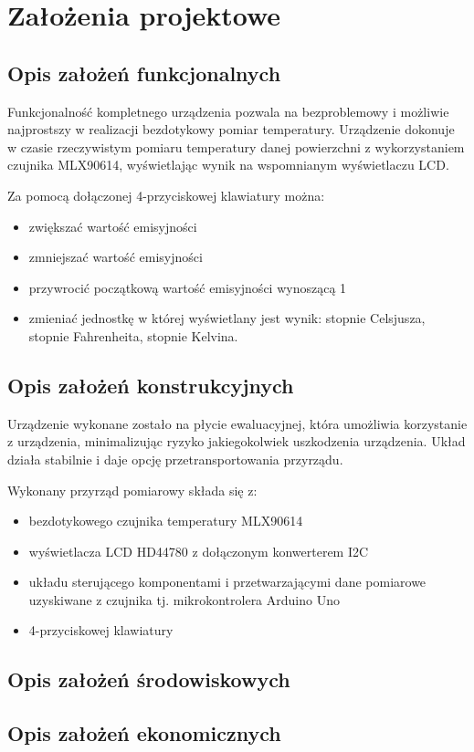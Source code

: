 \chapter{Założenia projektowe}

    \section{Opis założeń funkcjonalnych}

    Funkcjonalność kompletnego urządzenia pozwala na bezproblemowy i możliwie najprostszy w realizacji bezdotykowy pomiar temperatury. Urządzenie dokonuje w czasie rzeczywistym pomiaru temperatury danej powierzchni z wykorzystaniem czujnika MLX90614, wyświetlając wynik na wspomnianym wyświetlaczu LCD. 
    
    \vspace{12pt}

    Za pomocą dołączonej 4-przyciskowej klawiatury można:

    \begin{itemize}

        \item zwiększać wartość emisyjności
        \item zmniejszać wartość emisyjności
        \item przywrocić początkową wartość emisyjności wynoszącą 1
        \item zmieniać jednostkę w której wyświetlany jest wynik: stopnie Celsjusza, stopnie Fahrenheita, stopnie Kelvina.

    \end{itemize}

    \section{Opis założeń konstrukcyjnych}
    
    Urządzenie wykonane zostało na płycie ewaluacyjnej, która umożliwia korzystanie z urządzenia, minimalizując ryzyko jakiegokolwiek uszkodzenia urządzenia. Układ działa stabilnie i daje opcję przetransportowania przyrządu.

    \vspace{12pt}

    Wykonany przyrząd pomiarowy składa się z:

    \begin{itemize}

        \item bezdotykowego czujnika temperatury MLX90614
        \item wyświetlacza LCD HD44780 z dołączonym konwerterem I2C
        \item układu sterującego komponentami i przetwarzającymi dane pomiarowe uzyskiwane z czujnika tj. mikrokontrolera Arduino Uno
        \item 4-przyciskowej klawiatury 

    \end{itemize}

    \section{Opis założeń środowiskowych}
    
    

    \section{Opis założeń ekonomicznych}